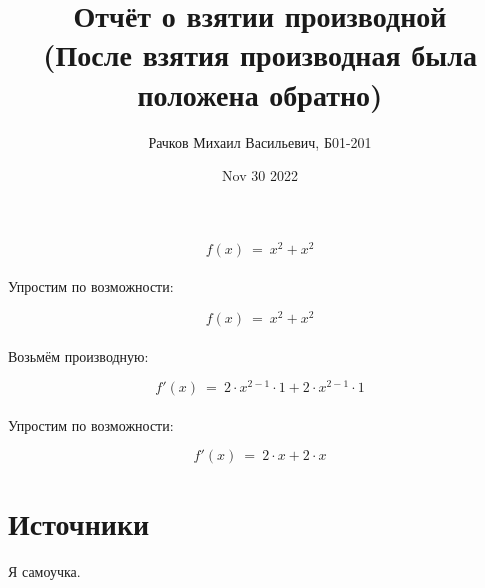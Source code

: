 \documentclass[a4paper, 12pt]{article}
\author{Рачков Михаил Васильевич, Б01-201}
\date{Nov 30 2022}
\title{\textbf{Отчёт о взятии производной} \\(После взятия производная была положена обратно)}
\begin{document}
        \maketitle 
            \maketitle
            \begin{equation}
            f(x)~=~x ^ {2} + x ^ {2}
    \end{equation}
    \\ Упростим по возможности: \\
            \maketitle
            \begin{equation}
            f(x)~=~x ^ {2} + x ^ {2}
    \end{equation}
    \\ Возьмём производную: \\
            \maketitle
            \begin{equation}
            f'(x)~=~2 \cdot x ^ {2 - 1} \cdot 1 + 2 \cdot x ^ {2 - 1} \cdot 1
    \end{equation}
    \\ Упростим по возможности: \\
            \maketitle
            \begin{equation}
            f'(x)~=~2 \cdot x + 2 \cdot x
    \end{equation}
    
    \section{Источники}
    Я самоучка.
    
    
\end{document}
